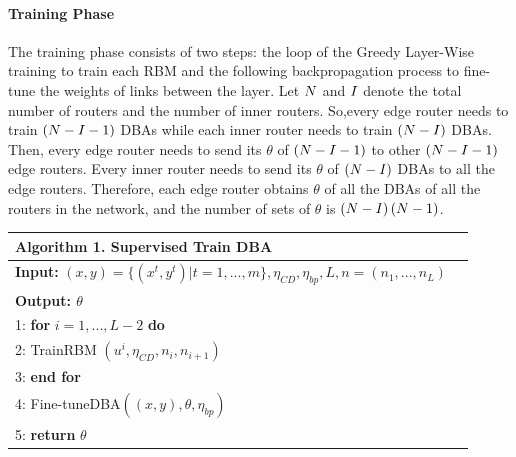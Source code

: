\documentclass[11pt]{report}
\begin{document}
	\paragraph{Training Phase}
    The training phase consists of two steps: the loop of the Greedy Layer-Wise training to train each RBM and the following backpropagation process to fine-tune the weights of links between the layer. Let $\mathnormal{N}$ and $\mathnormal{I}$ denote the total number of routers and the number of inner routers. So,every edge router needs to train $\left(\mathnormal{N} - \mathnormal{I} - 1\right)$ DBAs while each inner router needs to train $\left(\mathnormal{N} - \mathnormal{I}\right)$ DBAs. Then, every edge router needs to send its $\theta$ of $\left(\mathnormal{N} - \mathnormal{I} -1\right)$ to other $\left(\mathnormal{N} - \mathnormal{I} -1\right)$ edge routers. Every inner router needs to send its $\theta$ of $\left(\mathnormal{N} - \mathnormal{I}\right)$ DBAs to all the edge routers. Therefore, each edge router obtains $\theta$ of all the DBAs of all the routers in the network, and the number of sets of $\theta$ is $\left(\mathnormal{N} - \mathnormal{I}\right)\left(\mathnormal{N} - 1\right)$.\\
     
	\begin{tabular}{lc}
		\toprule
		\textbf{Algorithm 1}. Supervised Train DBA\\
		\hline
		\textbf{Input:} $\left(x,y\right)=\{\left(x^t,y^t\right)|t=1,...,m\}, \eta_{CD}, \eta_{bp},L, n=\left(n_1,...,n_L\right)$\\
		\textbf{Output: $\theta$}\\
		1: \textbf{for} $i=1,...,L-2$ \textbf{do}\\
		2: \quad TrainRBM $\left(u^i,\eta_{CD},n_i,n_{i+1}\right)$\\
		3: \textbf{end for}\\
		4: Fine-tuneDBA$\left(\left(x,y\right),\theta,\eta_{bp}\right)$\\
		5: \textbf{return} $\theta$\\
		\hline
	\end{tabular}
\end{document}
